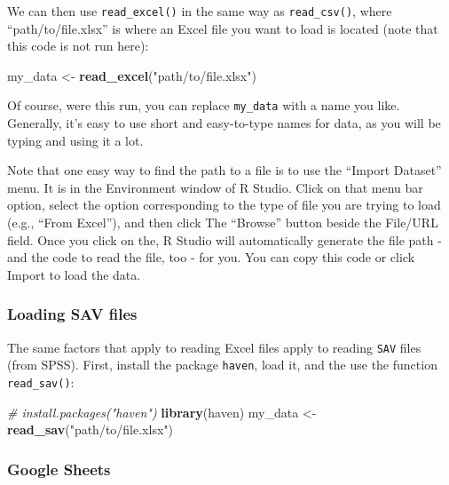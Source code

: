 \documentclass[]{article}
\newenvironment{Shaded}{\begin{snugshade}}{\end{snugshade}}
\newcommand{\KeywordTok}[1]{\textcolor[rgb]{0.13,0.29,0.53}{\textbf{#1}}}
\newcommand{\StringTok}[1]{\textcolor[rgb]{0.31,0.60,0.02}{#1}}
\newcommand{\CommentTok}[1]{\textcolor[rgb]{0.56,0.35,0.01}{\textit{#1}}}
\newcommand{\NormalTok}[1]{#1}
\begin{document}
We can then use \texttt{read\_excel()} in the same way as
\texttt{read\_csv()}, where ``path/to/file.xlsx'' is where an Excel file
you want to load is located (note that this code is not run here):

\begin{Shaded}
\begin{Highlighting}[]
\NormalTok{my_data <-}\StringTok{ }\KeywordTok{read_excel}\NormalTok{(}\StringTok{"path/to/file.xlsx"}\NormalTok{)}
\end{Highlighting}
\end{Shaded}

Of course, were this run, you can replace \texttt{my\_data} with a name
you like. Generally, it's easy to use short and easy-to-type names for
data, as you will be typing and using it a lot.

Note that one easy way to find the path to a file is to use the ``Import
Dataset'' menu. It is in the Environment window of R Studio. Click on
that menu bar option, select the option corresponding to the type of
file you are trying to load (e.g., ``From Excel''), and then click The
``Browse'' button beside the File/URL field. Once you click on the, R
Studio will automatically generate the file path - and the code to read
the file, too - for you. You can copy this code or click Import to load
the data.

\subsubsection{Loading SAV files}\label{loading-sav-files}

The same factors that apply to reading Excel files apply to reading
\texttt{SAV} files (from SPSS). First, install the package
\texttt{haven}, load it, and the use the function \texttt{read\_sav()}:

\begin{Shaded}
\begin{Highlighting}[]
\CommentTok{# install.packages("haven")}
\KeywordTok{library}\NormalTok{(haven)}
\NormalTok{my_data <-}\StringTok{ }\KeywordTok{read_sav}\NormalTok{(}\StringTok{"path/to/file.xlsx"}\NormalTok{)}
\end{Highlighting}
\end{Shaded}

\subsubsection{Google Sheets}\label{google-sheets}
\end{document}
